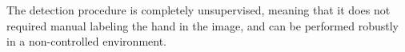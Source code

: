 The detection procedure is completely unsupervised, meaning that it does 
not required manual labeling the hand in the image, and can be performed 
robustly in a non-controlled environment.

